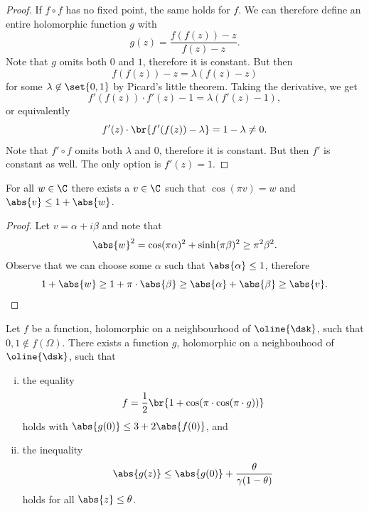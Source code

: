 \begin{proof}
If $f \circ f$ has no fixed point, the same holds for $f$. We can
therefore define an entire holomorphic function $g$ with
\[
g(z) = \frac{f(f(z)) - z}{f(z) - z}.
\]
Note that $g$ omits both $0$ and $1$, therefore it is constant. But
then
\[
f(f(z)) - z = \lambda (f(z) - z)
\]
for some $\lambda \not \in \set{0, 1}$ by Picard's little theorem.
Taking the derivative, we get
\[
f'(f(z)) \cdot f'(z) - 1 = \lambda (f'(z) - 1),
\]
or equivalently
\[
f'(z) \cdot \br{f'(f(z)) - \lambda} = 1 - \lambda \ne 0.
\]
Note that $f' \circ f$ omits both $\lambda$ and $0$, therefore it
is constant. But then $f'$ is constant as well. The only option is
$f'(z) = 1$.
\end{proof}


\begin{lema}
For all $w \in \C$ there exists a $v \in \C$ such that
$\cos(\pi v) = w$ and $\abs{v} \leq 1 + \abs{w}$.
\end{lema}

\begin{proof}
Let $v = \alpha + i \beta$ and note that
\[
\abs{w}^2 =
\cos(\pi \alpha)^2 + \sinh(\pi \beta)^2 \geq
\pi^2 \beta^2.
\]
Observe that we can choose some $\alpha$ such that
$\abs{\alpha} \leq 1$, therefore
\[
1 + \abs{w} \geq
1 + \pi \cdot \abs{\beta} \geq
\abs{\alpha} + \abs{\beta} \geq
\abs{v}. \qedhere
\]
\end{proof}

\begin{izrek}
Let $f$ be a function, holomorphic on a neighbourhood of
$\oline{\dsk}$, such that $0, 1 \not \in f(\Omega)$. There exists a
function $g$, holomorphic on a neighbouhood of $\oline{\dsk}$, such
that

\begin{enumerate}[i)]
\item the equality
\[
f = \frac{1}{2} \br{1 + \cos(\pi \cdot \cos(\pi \cdot g))}
\]
holds with $\abs{g(0)} \leq 3 + 2 \abs{f(0)}$, and
\item the inequality
\[
\abs{g(z)} \leq \abs{g(0)} + \frac{\theta}{\gamma (1 - \theta)}
\]
holds for all $\abs{z} \leq \theta$.
\end{enumerate}
\end{izrek}

